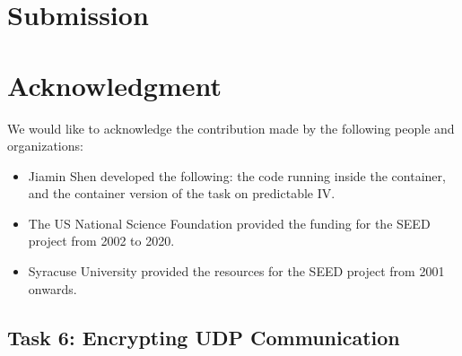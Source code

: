 \section{Submission}





\section{Acknowledgment}

We would like to acknowledge the contribution made by the following people and organizations:

\begin{itemize}
\item Jiamin Shen developed the following: the code running inside the container, 
      and the container version of the task on predictable IV.

\item The US National Science Foundation provided the funding for the SEED project from 2002 
      to 2020.

\item Syracuse University provided the resources for the SEED project from 2001 onwards.
\end{itemize}
 










\subsection{Task 6: Encrypting UDP Communication}


